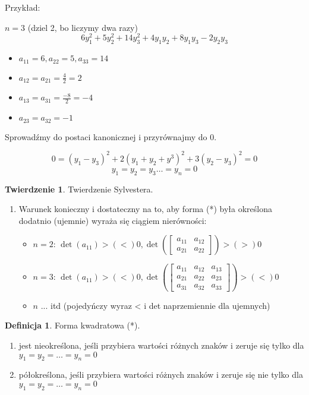 \documentclass{article}
\theoremstyle{definition}
\newtheorem{de}{Definicja}[subsection]
\theoremstyle{definition}
\newtheorem{tw}{Twierdzenie}[subsection]
\theoremstyle{definition}
\theoremstyle{definition}
\begin{document}
Przykład:

$n=3$ (dziel 2, bo liczymy dwa razy)\\
\[6y_1^2+5y_2^2+14y_3^2+4y_1y_2+8y_1y_3-2y_2y_3\]

\begin{itemize}
    \item $a_{11}=6, a_{22}=5, a_{33}=14$
    \item $a_{12}=a_{21}=\frac{4}{2}=2$
    \item $a_{13}=a_{31}=\frac{-8}{2}=-4$
    \item $a_{23}=a_{32}=-1$
\end{itemize}

Sprowadźmy do postaci kanonicznej i przyrównajmy do 0.

\[0=(y_1-y_3)^2+2(y_1+y_2+y^3)^2+3(y_2-y_3)^2=0\]
\[y_1=y_2=y_3\dots=y_n=0\]

\begin{tw}
    Twierdzenie Sylvestera.
    \begin{enumerate}
        \item Warunek konieczny i dostateczny na to, aby forma (*) była określona dodatnio (ujemnie) wyraża się ciągiem nierówności:
        \begin{itemize}
        \item $n=2$: $\det(a_{11})> (<) 0, \det\left(\begin{bmatrix}
            a_{11} & a_{12} \\
            a_{21} & a_{22} 
            \end{bmatrix} \right) > (>) 0$\\
        \item $n=3$: $\det(a_{11})> (<) 0, \det\left( \begin{bmatrix}
            a_{11} & a_{12} & a_{13} \\
            a_{21} & a_{22} & a_{23} \\
            a_{31} & a_{32} & a_{33} 
            \end{bmatrix} \right)  > (<) 0$\\
        \item $n$ ... itd (pojedyńczy wyraz < i det naprzemiennie dla ujemnych)
        \end{itemize}
    \end{enumerate}
\end{tw}

\begin{de}
    Forma kwadratowa (*).
    \begin{enumerate}
        \item jest nieokreślona, jeśli przybiera wartości różnych znaków i zeruje się tylko dla \\ $y_1=y_2=\dots=y_n=0$
        \item półokreślona, jeśli przybiera wartości różnych znaków i zeruje się nie tylko dla \\ $y_1=y_2=\dots=y_n=0$
    \end{enumerate}
\end{de}
\end{document}
